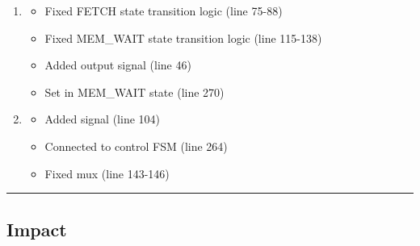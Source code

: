 \begin{record}

\begin{enumerate}
\def\labelenumi{\arabic{enumi}.}
\item
  \textbf{}

  \begin{itemize}
  \tightlist
  \item
    Fixed FETCH state transition logic (line 75-88)
  \item
    Fixed MEM\_WAIT state transition logic (line 115-138)
  \item
    Added  output signal (line 46)
  \item
    Set  in MEM\_WAIT state (line 270)
  \end{itemize}
\item
  \textbf{}

  \begin{itemize}
  \tightlist
  \item
    Added  signal (line 104)
  \item
    Connected  to control FSM (line 264)
  \item
    Fixed  mux (line 143-146)
  \end{itemize}
\end{enumerate}

\begin{center}\rule{0.5\linewidth}{0.5pt}\end{center}

\end{record}

\subsection{Impact}\label{cr:fix:critical-fixes:impact}

